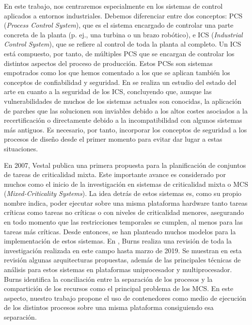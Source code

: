 En este trabajo, nos centraremos especialmente en los sistemas de control
aplicados a entornos industriales. Debemos diferenciar entre dos conceptos: PCS
(\textit{Process Control System}), que es el sistema encargado de controlar una
parte concreta de la planta (p. ej., una turbina o un brazo robótico), e ICS
(\textit{Industrial Control System}), que se refiere al control de toda la
planta al completo. Un ICS está compuesto, por tanto, de múltiples PCS que se
encargan de controlar los distintos aspectos del proceso de producción. Estos
PCSs son sistemas empotrados como los que hemos comentado a los que se aplican
también los conceptos de confiabilidad y seguridad. En
\cite{krotofil_industrial_2013} se realiza un estudio del estado del arte en
cuanto a la seguridad de los ICS, concluyendo que, aunque las vulnerabilidades
de muchos de los sistemas actuales son conocidas, la aplicación de parches que
las solucionen son inviables debido a los altos costes asociados a la
recertificación o directamente debido a la incompatibilidad con algunos sistemas
más antiguos. Es necesario, por tanto, incorporar los conceptos de seguridad a
los procesos de diseño desde el primer momento para evitar dar lugar a estas
situaciones.

En 2007, Vestal \cite{vestal_preemptive_2007} publica una primera propuesta para
la planificación de conjuntos de tareas de criticalidad mixta. Este importante
avance es considerado por muchos como el inicio de la investigación en sistemas
de criticalidad mixta o MCS (\textit{Mixed-Criticality Systems}). La idea detrás
de estos sistemas es, como su propio nombre indica, poder ejecutar sobre una
misma plataforma hardware tanto tareas críticas como tareas no críticas o con
niveles de criticalidad menores, asegurando en todo momento que las
restricciones temporales se cumplen, al menos para las tareas más críticas.
Desde entonces, se han planteado muchos modelos para la implementación de estos
sistemas. En \cite{burns_mixed_2015}, Burns realiza una revisión de toda la
investigación realizada en este campo hasta marzo de 2019. Se muestran en esta
revisión algunas arquitecturas propuestas, además de las principales técnicas de
análisis para estos sistemas en plataformas uniprocesador y multiprocesador.
Burns identifica la conciliación entre la separación de los procesos y la
compartición de los recursos como el principal problema de los MCS. En este
aspecto, nuestro trabajo propone el uso de contenedores como medio de ejecución
de los distintos procesos sobre una misma plataforma consiguiendo esa
separación.

